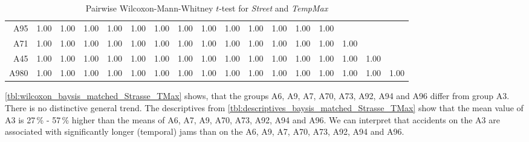 \begin{table}[ht]
\begin{tabular}{rrrrrrrrrrrrrrrrr}
		A95 	& 1.00 & 1.00 & 1.00 & 1.00 & 1.00 & 1.00 & 1.00 & 1.00 & 1.00 & 1.00 & 1.00 & 1.00 & 1.00 &  &  &  \\ 
		A71 	& 1.00 & 1.00 & 1.00 & 1.00 & 1.00 & 1.00 & 1.00 & 1.00 & 1.00 & 1.00 & 1.00 & 1.00 & 1.00 & 1.00 &  &  \\ 
		A45 	& 1.00 & 1.00 & 1.00 & 1.00 & 1.00 & 1.00 & 1.00 & 1.00 & 1.00 & 1.00 & 1.00 & 1.00 & 1.00 & 1.00 & 1.00 &  \\ 
		A980 	& 1.00 & 1.00 & 1.00 & 1.00 & 1.00 & 1.00 & 1.00 & 1.00 & 1.00 & 1.00 & 1.00 & 1.00 & 1.00 & 1.00 & 1.00 & 1.00 \\ 
		\bottomrule
	\end{tabular}
	\caption{Pairwise Wilcoxon-Mann-Whitney $t$-test for \textit{Street} and \textit{TempMax}}
	\label{tbl:wilcoxon_baysis_matched_Strasse_TMax}
\end{table}
\autoref{tbl:wilcoxon_baysis_matched_Strasse_TMax} shows, that the groups A6, A9, A7, A70, A73, A92, A94 and A96 differ from group A3. There is no distinctive general trend. The descriptives from \autoref{tbl:descriptives_baysis_matched_Strasse_TMax} show that the mean value of A3 is 27\,\% - 57\,\% higher than the means of A6, A7, A9, A70, A73, A92, A94 and A96. We can interpret that accidents on the A3 are associated with significantly longer (temporal) jams than on the A6, A9, A7, A70, A73, A92, A94 and A96.
